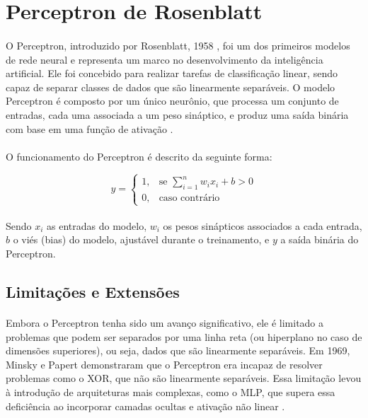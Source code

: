 \section{Perceptron de Rosenblatt}

\paragraph{} O Perceptron, introduzido por Rosenblatt, 1958 \cite{rosenblatt1958perceptron}, foi um dos primeiros modelos de rede neural e representa um marco no desenvolvimento da inteligência artificial. Ele foi concebido para realizar tarefas de classificação linear, sendo capaz de separar classes de dados que são linearmente separáveis. O modelo Perceptron é composto por um único neurônio, que processa um conjunto de entradas, cada uma associada a um peso sináptico, e produz uma saída binária com base em uma função de ativação \cite{rosenblatt1958perceptron}.

\paragraph{} O funcionamento do Perceptron é descrito da seguinte forma:

\begin{equation}
	y = \begin{cases}
		1, & \text{se } \sum_{i=1}^{n} w_i x_i + b > 0 \\
		0, & \text{caso contrário}
	\end{cases}
\end{equation}

\paragraph{} Sendo \(x_i\) as entradas do modelo, \(w_i\) os pesos sinápticos associados a cada entrada, \(b\) o viés (bias) do modelo, ajustável durante o treinamento, e \(y\) a saída binária do Perceptron.

\subsection{Limitações e Extensões}

\paragraph{} Embora o Perceptron tenha sido um avanço significativo, ele é limitado a problemas que podem ser separados por uma linha reta (ou hiperplano no caso de dimensões superiores), ou seja, dados que são linearmente separáveis. Em 1969, Minsky e Papert \cite{minsky1969perceptrons} demonstraram que o Perceptron era incapaz de resolver problemas como o XOR, que não são linearmente separáveis. Essa limitação levou à introdução de arquiteturas mais complexas, como o \ac{MLP}, que supera essa deficiência ao incorporar camadas ocultas e ativação não linear \cite{minsky1969perceptrons}.

